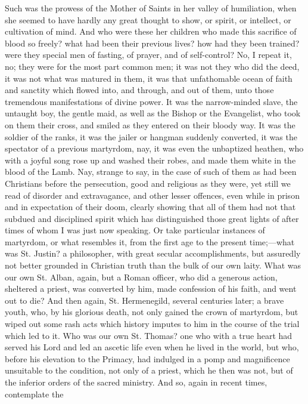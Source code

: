 Such was the prowess of the Mother of Saints in her
valley of humiliation, when she seemed to have hardly any
great thought to show, or spirit, or intellect, or
cultivation of mind. And who were these her children who
made this sacrifice of blood so freely? what had been
their previous lives? how had they been trained? were
they special men of fasting, of prayer, and of
self-control? No, I repeat it, no; they were for the most
part common men; it was not they who did the deed, it was
not what was matured in them, it was that unfathomable
ocean of faith and sanctity which flowed into, and
through, and out of them, unto those tremendous
manifestations of divine power. It was the narrow-minded
slave, the untaught boy, the gentle maid, as well as the
Bishop or the Evangelist, who took on them their cross,
and smiled as they entered on their bloody way. It was
the soldier of the ranks, it was the jailer or hangman
suddenly converted, it was the spectator of a previous
martyrdom, nay, it was even the unbaptized heathen, who
with a joyful song rose up and washed their robes, and
made them white in the blood of the Lamb. Nay, strange to
say, in the case of such of them as had been Christians
before the persecution, good and religious as they were,
yet still we read of disorder and extravagance, and other
lesser offences, even while in prison and in expectation
of their doom, clearly showing that all of them had not
that subdued and disciplined spirit which has
distinguished those great lights of after times of whom I
was just now speaking. Or take particular instances of
martyrdom, or what resembles it, from the first age to
the present time;—what was St. Justin? a
philosopher, with great secular accomplishments, but
assuredly not better grounded in Christian truth than the
bulk of our own laity. What was our own St. Alban, again,
but a Roman officer, who did a generous action, sheltered
a priest, was converted by him, made confession of his
faith, and went out to die? And then again, St.
Hermenegild, several centuries later; a brave youth, who,
by his glorious death, not only gained the crown of
martyrdom, but wiped out some rash acts which history
imputes to him in the course of the trial which led to
it. Who was our own St. Thomas? one who with a true heart
had served his Lord and led an ascetic life even when he
lived in the world, but who, before his elevation to the
Primacy, had indulged in a pomp and magnificence
unsuitable to the condition, not only of a priest, which
he then was not, but of the inferior orders of the sacred
ministry. And so, again in recent times, contemplate the
